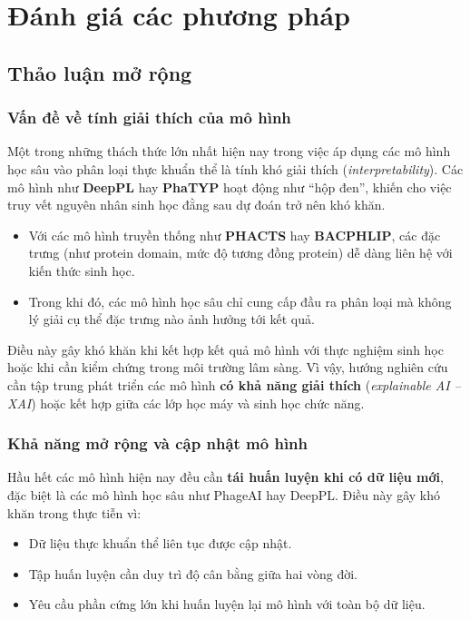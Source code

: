 
\chapter{Đánh giá các phương pháp}
\section{Thảo luận mở rộng}

\subsection{Vấn đề về tính giải thích của mô hình}

Một trong những thách thức lớn nhất hiện nay trong việc áp dụng các mô hình học sâu vào phân loại thực khuẩn thể là tính khó giải thích (\textit{interpretability}). Các mô hình như \textbf{DeepPL} hay \textbf{PhaTYP} hoạt động như “hộp đen”, khiến cho việc truy vết nguyên nhân sinh học đằng sau dự đoán trở nên khó khăn.

\begin{itemize}
    \item Với các mô hình truyền thống như \textbf{PHACTS} hay \textbf{BACPHLIP}, các đặc trưng (như protein domain, mức độ tương đồng protein) dễ dàng liên hệ với kiến thức sinh học.
    \item Trong khi đó, các mô hình học sâu chỉ cung cấp đầu ra phân loại mà không lý giải cụ thể đặc trưng nào ảnh hưởng tới kết quả.
\end{itemize}

Điều này gây khó khăn khi kết hợp kết quả mô hình với thực nghiệm sinh học hoặc khi cần kiểm chứng trong môi trường lâm sàng. Vì vậy, hướng nghiên cứu cần tập trung phát triển các mô hình \textbf{có khả năng giải thích} (\textit{explainable AI – XAI}) hoặc kết hợp giữa các lớp học máy và sinh học chức năng.

\subsection{Khả năng mở rộng và cập nhật mô hình}

Hầu hết các mô hình hiện nay đều cần \textbf{tái huấn luyện khi có dữ liệu mới}, đặc biệt là các mô hình học sâu như PhageAI hay DeepPL. Điều này gây khó khăn trong thực tiễn vì:

\begin{itemize}
    \item Dữ liệu thực khuẩn thể liên tục được cập nhật.
    \item Tập huấn luyện cần duy trì độ cân bằng giữa hai vòng đời.
    \item Yêu cầu phần cứng lớn khi huấn luyện lại mô hình với toàn bộ dữ liệu.
\end{itemize}


